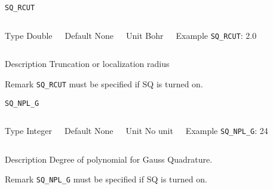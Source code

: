 \begin{frame}[allowframebreaks]{\texttt{{SQ\_RCUT}}} \label{SQ_RCUT}
\vspace*{-12pt}
\begin{columns}
\begin{block}{Type}
Double
\end{block}

\begin{block}{Default}
None
\end{block}

\begin{block}{Unit}
Bohr
\end{block}

\begin{block}{Example}
\texttt{SQ\_RCUT}: 2.0
\end{block}
\end{columns}

\begin{block}{Description}
Truncation or localization radius
\end{block}

\begin{block}{Remark}
\texttt{{SQ\_RCUT}} must be specified if SQ is turned on.
\end{block}
\end{frame}

\begin{frame}[allowframebreaks]{\texttt{SQ\_NPL\_G}} \label{SQ_NPL_G}
\vspace*{-12pt}
\begin{columns}
\begin{block}{Type}
Integer
\end{block}

\begin{block}{Default}
None
\end{block}

\begin{block}{Unit}
No unit
\end{block}

\begin{block}{Example}
\texttt{SQ\_NPL\_G}: 24
\end{block}
\end{columns}

\begin{block}{Description}
Degree of polynomial for Gauss Quadrature.
\end{block}

\begin{block}{Remark}
\texttt{SQ\_NPL\_G} must be specified if SQ is turned on.
\end{block}

\end{frame}


